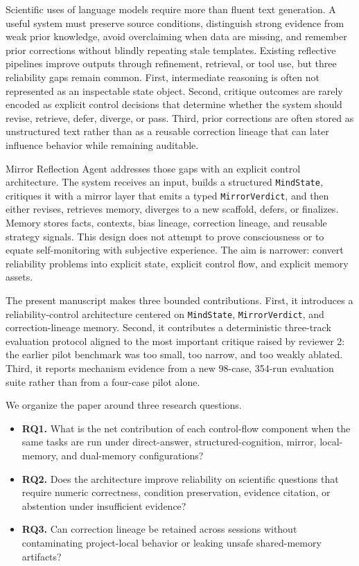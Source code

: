 \documentclass[12pt]{article}
\begin{document}
Scientific uses of language models require more than fluent text generation. A useful system must preserve source conditions, distinguish strong evidence from weak prior knowledge, avoid overclaiming when data are missing, and remember prior corrections without blindly repeating stale templates. Existing reflective pipelines improve outputs through refinement, retrieval, or tool use, but three reliability gaps remain common. First, intermediate reasoning is often not represented as an inspectable state object. Second, critique outcomes are rarely encoded as explicit control decisions that determine whether the system should revise, retrieve, defer, diverge, or pass. Third, prior corrections are often stored as unstructured text rather than as a reusable correction lineage that can later influence behavior while remaining auditable.

Mirror Reflection Agent addresses those gaps with an explicit control architecture. The system receives an input, builds a structured \texttt{MindState}, critiques it with a mirror layer that emits a typed \texttt{MirrorVerdict}, and then either revises, retrieves memory, diverges to a new scaffold, defers, or finalizes. Memory stores facts, contexts, bias lineage, correction lineage, and reusable strategy signals. This design does not attempt to prove consciousness or to equate self-monitoring with subjective experience. The aim is narrower: convert reliability problems into explicit state, explicit control flow, and explicit memory assets.

The present manuscript makes three bounded contributions. First, it introduces a reliability-control architecture centered on \texttt{MindState}, \texttt{MirrorVerdict}, and correction-lineage memory. Second, it contributes a deterministic three-track evaluation protocol aligned to the most important critique raised by reviewer 2: the earlier pilot benchmark was too small, too narrow, and too weakly ablated. Third, it reports mechanism evidence from a new 98-case, 354-run evaluation suite rather than from a four-case pilot alone.

We organize the paper around three research questions.
\begin{itemize}
\item \textbf{RQ1.} What is the net contribution of each control-flow component when the same tasks are run under direct-answer, structured-cognition, mirror, local-memory, and dual-memory configurations?
\item \textbf{RQ2.} Does the architecture improve reliability on scientific questions that require numeric correctness, condition preservation, evidence citation, or abstention under insufficient evidence?
\item \textbf{RQ3.} Can correction lineage be retained across sessions without contaminating project-local behavior or leaking unsafe shared-memory artifacts?
\end{itemize}
\end{document}
